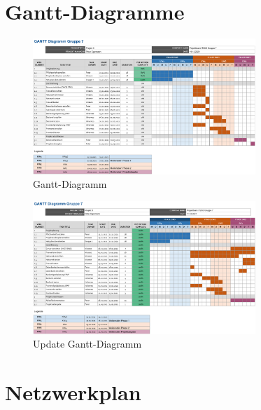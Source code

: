 \documentclass[a4paper,
    11pt,
    headings=small,
    ngerman,
    listof=totoc,
    numbers=noenddot]{scrreprt}[2021/11/13]
\begin{document}
\newpage

\listoffigures
\listoftables
\lstlistoflistings
\printbibliography[keyword=Quelle,title={Literaturverzeichnis},heading=bibintoc]

\newpage

\appendix
{}



\chapter{Gantt-Diagramme}

\begin{figure}[h!]
  \centering
  \includegraphics[angle=90,origin=c,width=0.75\textwidth]{data/Gantt.png}
  \caption{Gantt-Diagramm}
  \label{fig:Gantt}
\end{figure}

\newpage

\begin{figure}[h!]
  \centering
  \includegraphics[angle=90,origin=c,width=0.75\textwidth]{data/Gantt_Abschluss.png}
  \caption{Update Gantt-Diagramm}
  \label{fig:GanttUpdate}
\end{figure}



\chapter{Netzwerkplan}
\end{document}
